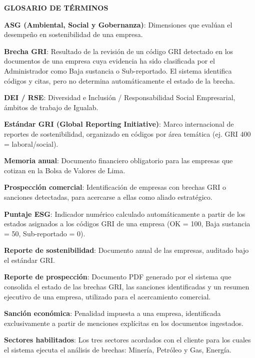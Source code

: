 \clearpage
\thispagestyle{fancy}
\begin{center}
{\bfseries\fontsize{14}{17}\selectfont GLOSARIO DE TÉRMINOS}
\end{center}
\vspace{10pt}

\newcommand{\glos}[2]{\par\vspace{4pt}\noindent\textbf{#1}: #2\par}
\newcommand{\grupo}[1]{\par\vspace{10pt}\noindent\textbf{\underline{#1}}\par\vspace{2pt}}
\glos{ASG (Ambiental, Social y Gobernanza)}{Dimensiones que evalúan el desempeño en sostenibilidad de una empresa.}
\glos{Brecha GRI}{Resultado de la revisión de un código GRI detectado en los documentos de una empresa cuya evidencia ha sido clasificada por el Administrador como Baja sustancia o Sub-reportado. El sistema identifica códigos y citas, pero no determina automáticamente el estado de la brecha.}
\glos{DEI / RSE}{Diversidad e Inclusión / Responsabilidad Social Empresarial, ámbitos de trabajo de Igualab.}
\glos{Estándar GRI (Global Reporting Initiative)}{Marco internacional de reportes de sostenibilidad, organizado en códigos por área temática (ej. GRI 400 = laboral/social).}
\glos{Memoria anual}{Documento financiero obligatorio para las empresas que cotizan en la Bolsa de Valores de Lima.}
\glos{Prospección comercial}{Identificación de empresas con brechas GRI o sanciones detectadas, para acercarse a ellas como aliado estratégico.}
\glos{Puntaje ESG}{Indicador numérico calculado automáticamente a partir de los estados asignados a los códigos GRI de una empresa (OK = 100, Baja sustancia = 50, Sub-reportado = 0).}
\glos{Reporte de sostenibilidad}{Documento anual de las empresas, auditado bajo el estándar GRI.}
\glos{Reporte de prospección}{Documento PDF generado por el sistema que consolida el estado de las brechas GRI, las sanciones identificadas y un resumen ejecutivo de una empresa, utilizado para el acercamiento comercial.}
\glos{Sanción económica}{Penalidad impuesta a una empresa, identificada exclusivamente a partir de menciones explícitas en los documentos ingestados.}
\glos{Sectores habilitados}{Los tres sectores acordados con el cliente para los cuales el sistema ejecuta el análisis de brechas: Minería, Petróleo y Gas, Energía.}

